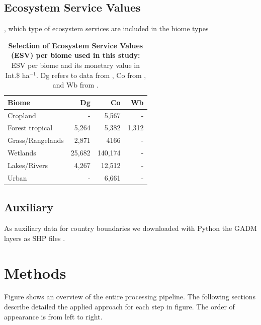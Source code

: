	\subsection{Ecosystem Service Values}
		,
		which type of ecosystem services are included in the biome types
		\begin{table}[ht]
			\centering
			\caption[Selection of Ecosystem Service Values (ESV) used in this study]{\textbf{Selection of Ecosystem Service Values (ESV) per biome used in this study:} ESV per biome and its monetary value in Int.\$ ha$^{-1}$. Dg refers to data from \citeauthor{Groot2012}, Co from \citeauthor{Costanza2014}, and Wb from \citeauthor{Siikamaki2015}.\citep{Groot2012,Costanza2014,Siikamaki2015}}
			\label{tab:esv_factors}
			\begin{tabular}{lrrr}
				\hline
				Biome & Dg & Co & Wb \\\hline
				Cropland & - & 5,567 & -\\
				Forest tropical & 5,264 & 5,382 & 1,312\\
				Grass/Rangelands & 2,871 & 4166 & -\\
				Wetlands & 25,682 & 140,174 & -\\
				Lakes/Rivers & 4,267 & 12,512 & -\\
				Urban & - & 6,661 & -\\\hline
			\end{tabular}
		\end{table}

	\subsection{Auxiliary}
		As auxiliary data for country boundaries we downloaded with Python the \ac{GADM} layers as \ac{SHP} files \citep{Hijmans2018,Rossum2018}.

\section{Methods}
\label{sec:methods}
	Figure  shows an overview of the entire processing pipeline. The following sections describe detailed the applied approach for each step in figure. The order of appearance is from left to right. 

